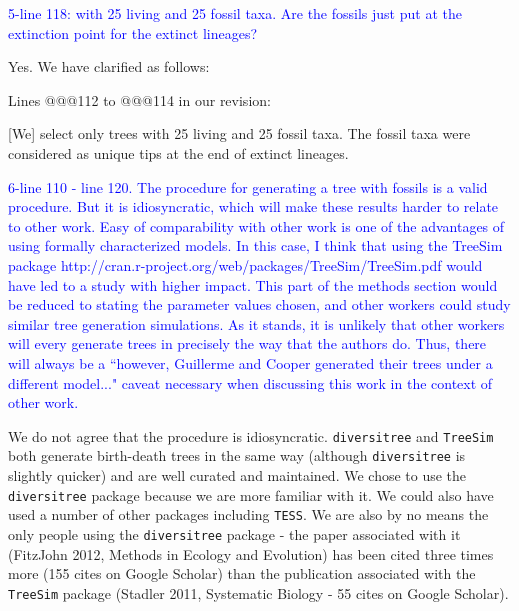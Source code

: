 \documentclass[11pt]{letter}
\begin{document}
\begin{letter}{}
\textcolor{blue}{5-line 118: with 25 living and 25 fossil taxa. Are the fossils just put at the extinction point for the extinct lineages?}

Yes. We have clarified as follows:

Lines @@@112 to @@@114 in our revision:

\hfill\begin{minipage}{\dimexpr\textwidth-1cm}
[We] select only trees with 25 living and 25 fossil taxa. The fossil taxa were considered as unique tips at the end of extinct lineages. %
\end{minipage}


\textcolor{blue}{6-line 110 - line 120. The procedure for generating a tree with fossils is a valid procedure. But it is idiosyncratic, which will make these results harder to relate to other work. Easy of comparability with other work is one of the advantages of using formally characterized models. In this case, I think that using the TreeSim package http://cran.r-project.org/web/packages/TreeSim/TreeSim.pdf would have led to a study with higher impact. This part of the methods section would be reduced to stating the parameter values chosen, and other workers could study similar tree generation simulations. As it stands, it is unlikely that other workers will every generate trees in precisely the way that the authors do. Thus, there will always be a ``however, Guillerme and Cooper generated their trees under a different model..." caveat necessary when discussing this work in the context of other work.}

We do not agree that the procedure is idiosyncratic. \texttt{diversitree} and \texttt{TreeSim} both generate birth-death trees in the same way (although \texttt{diversitree} is slightly quicker) and are well curated and maintained. We chose to use the \texttt{diversitree} package because we are more familiar with it. We could also have used a number of other packages including \texttt{TESS}. We are also by no means the only people using the \texttt{diversitree} package - the paper associated with it (FitzJohn 2012, Methods in Ecology and Evolution) has been cited three times more (155 cites on Google Scholar) than the publication associated with the \texttt{TreeSim} package (Stadler 2011, Systematic Biology - 55 cites on Google Scholar).


\end{letter}
\end{document}
